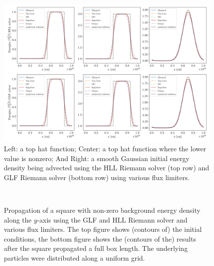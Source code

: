 \begin{figure}
 \centering
 \includegraphics[width=\textwidth]{figures/RHD/Riemann/1D_limiters.png}%
 \caption{
Left: a top hat function; Center: a top hat function where the lower value is nonzero; And Right: a
smooth Gaussian initial energy density being advected using the HLL Riemann solver (top row) and
GLF Riemann solver (bottom row) using various flux limiters.
 }
 \label{fig:rt-riemann-limiter-1D}
\end{figure}




\begin{figure}
 \centering
 \\
 \caption{
Propagation of a square with non-zero background energy density along the $y$-axis using the GLF
and HLL Riemann solver and various flux limiters. The top figure shows (contours of) the initial
conditions, the bottom figure shows the (contours of the) results after the square propagated a
full box length. The underlying particles were distributed along a uniform grid.
 }
 \label{fig:rt-riemann-limiter-2D-Group2-uniform}
\end{figure}




